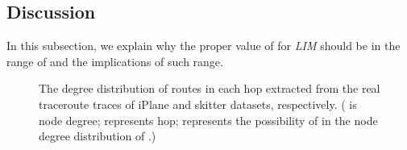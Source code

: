 \documentclass[a4paper]{llncs}
\begin{document}
\begin{comment}
Second, in order to further check the universalities of  in the range of  and around 0.5, we conduct experiments on two specific graphs of Table \ref{DiffAlphaForDiffDegrees}, both with {\it average degree} 12 and with initial {\it clustering coefficient} 0.006053 and 0.059725 for BA and GLP models, respectively. The experiments are done on different variations, with different {\it clustering coefficient}, of the two original graphs obtained by exchanging the edges between nodes but without changing the degree of the node. Table \ref{DiffAlphaForDiffClustering} presents the range of  with which \textit{LIM} performs much better than \textit{NDM}. Besides, it shows the values of  with estimated properties are equal to or the most close to the true properties of BA and GLP models. The number of nodes is 10,000 and the simulation experiments for the four models are conducted from 200 sources to 2,000 destinations that are randomly selected from the nodes. Also, the results are the average ones of 100 experiments. This table shows that, in most time, \textit{LIM} is much better than \textit{NDM} on estimating the network topological properties of the two synthetic graph models. Moreover, It implies the region of  and also the best value of  are almost unchanged on the synthetic graphs with different {\it clustering coefficient} corresponding to those of the two original graphs with {\it average degree} 12 in Table \ref{DiffAlphaForDiffDegrees}. Consequently, it could be concluded that \textit{LIM} is actually the best model now and also  in the region of  and around 0.5 for \textit{LIM} are general for best estimating of different topological properties of the underlying networks.

In conclusion, through the examination on both real network datasets and also various synthetic graphs, \textit{LIM} with  in the range of , more specifically  around 0.5, is recommended to best estimate almost all the topological properties of the underlying network.
\end{comment}

\subsection{Discussion}
In this subsection, we explain why the proper value of
 for \textit{LIM} should be in the range of  and the implications of such range.


\begin{figure*}[!t]
\centering
{}
\hspace{2em}
\vspace{-1.7em}
\caption{The degree distribution of routes in each hop extracted from the real traceroute traces of iPlane and skitter datasets, respectively. ( is node degree;  represents hop;  represents the possibility of  in the node degree distribution of .)}
\label{figure12}
\vspace{-0.8em}
\end{figure*}
\end{document}
